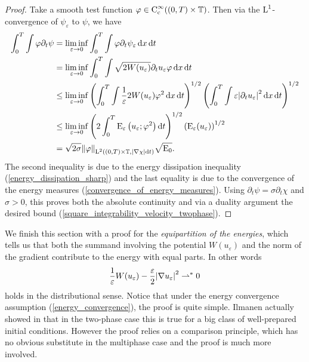 \begin{proof}
	Take a smooth test function $ \varphi \in \operatorname{C}_{ \mathrm{ c } }^{ \infty } 
	( ( 0 , T ) \times \operatorname{\mathbb{T}} )$. 
	Then via the $ \operatorname{L}^{ 1 } $-convergence of $ \psi_{ \varepsilon } $ to $ 
	\psi 
	$, we have
	\begin{align*}
		\int_{ 0 }^{ T }
			\int 
				\varphi
		\partial_{ t } \psi
		& =
		\liminf_{ \varepsilon \to 0 }
		\int_{ 0 }^{ T }
		\int
		\varphi
		\partial_{ t } \psi_{ \varepsilon } 
		\dd{ x }
		\dd{ t }
		\\
		& =
		\liminf_{ \varepsilon \to 0 }
		\int_{ 0 }^{ T }
		\int
		\sqrt{ 2 W ( u_{ \varepsilon } ) }
		\partial_{ t } u_{ \varepsilon }
		\varphi
		\dd{ x }
		\dd{ t }
		\\
		& \leq
		\liminf_{ \varepsilon \to 0 }
		\left( 
		\int_{ 0 }^{ T }
		\int
		\frac{ 1 }{ \varepsilon } 2 W ( u_{ \varepsilon } )
		\varphi^{ 2 }
		\dd{ x }
		\dd{ t }
		\right)^{ 1/ 2 }
		\left(
		\int_{ 0 }^{ T }
		\int
		\varepsilon
		\abs{ \partial_{ t } u_{ \varepsilon } }^{ 2 }
		\dd{ x }
		\dd{ t }
		\right)^{ 1/2 }
		\\
		& \leq
		\liminf_{ \varepsilon \to 0 }
		\left(
		2 
		\int_{ 0 }^{ T }
		\operatorname{E}_{ \varepsilon} \left( u_{ \varepsilon } ; \varphi^{ 2 } \right)
		\dd{ t }
		\right)^{ 1/ 2 }
		\left(
		\operatorname{E}_{ \varepsilon } ( u_{ \varepsilon } )
		\right)^{ 1/2 }
		\\
		& =
		\sqrt{ 2 \sigma }
		\norm{ \varphi }_{ \operatorname{L}^{ 2 } ( ( 0 , T ) \times \operatorname{\mathbb{T}} , \abs{ 
				\nabla \chi } \dd{ t 
			} ) }
		\sqrt{ \operatorname{E}_{ 0 } }.
	\end{align*}
	The second inequality is due to the energy dissipation inequality 
	(\ref{energy_dissipation_sharp}) and the last equality is due to the 
	convergence of the energy measures 
	(\ref{convergence_of_energy_measures}). Using  $ \partial_{ t } \psi = 
	\sigma \partial_{ t } \chi $ 
	and $ \sigma > 0 $,
	this proves both the absolute continuity and via a duality argument the 
	desired bound (\ref{square_integrability_velocity_twophase}).
\end{proof}

We finish this section with a proof for the \emph{equipartition of the 
	energies}, which 
tells us that both the summand involving the potential $ W ( u_{ \varepsilon } 
) $ and the norm of the gradient contribute to the energy with equal parts. In 
other words
\begin{equation*}
	\frac{ 1 }{ \varepsilon } W ( u_{ \varepsilon } ) 
	- 
	\frac{ \varepsilon }{ 2 }
	\abs{ \nabla u_{ \varepsilon } }^{ 2 }
	\rightharpoonup^{ \ast }
	0 
\end{equation*}
holds in the distributional sense. Notice that under the 
energy convergence assumption (\ref{energy_convergence}), the proof is quite 
simple. Ilmanen actually showed in 
\cite{ilmanen_convergence_of_ac_to_brakkes_mcf} that in the two-phase case this 
is true
for a big class of well-prepared initial conditions. However the proof relies 
on a 
comparison principle, which has no obvious substitute in the multiphase case 
and the proof is much more involved.

